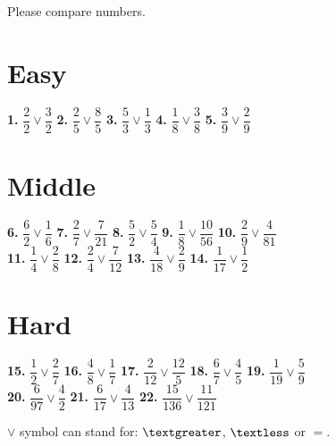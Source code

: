 \documentclass[a4paper, 12pt]{article}
\begin{document}
	{\large Please compare numbers.}	
	
	\section* {{\Large Easy}}
	
	{\Large \textbf{1.} $\dfrac{2}{2}\vee\dfrac{3}{2}$ \hspace{0.5cm}
		   \textbf{2.} $\dfrac{2}{5}\vee\dfrac{8}{5}$ \hspace{0.5cm}
		   \textbf{3.} $\dfrac{5}{3}\vee\dfrac{1}{3}$ \hspace{0.5cm}
		   \textbf{4.} $\dfrac{1}{8}\vee\dfrac{3}{8}$ \hspace{0.5cm}
           \textbf{5.} $\dfrac{3}{9}\vee\dfrac{2}{9}$
	
	\section* {{\Large Middle}}
	
	{\Large \textbf{6.} $\dfrac{6}{2}\vee\dfrac{1}{6}$ \hspace{0.5cm}
		   \textbf{7.} $\dfrac{2}{7}\vee\dfrac{7}{21}$ \hspace{0.5cm}
		   \textbf{8.} $\dfrac{5}{2}\vee\dfrac{5}{4}$ \hspace{0.5cm}
		   \textbf{9.} $\dfrac{1}{8}\vee\dfrac{10}{56}$ \hspace{0.5cm}
		   \textbf{10.} $\dfrac{2}{9}\vee\dfrac{4}{81}$ \\ [0.5cm]
		   \textbf{11.} $\dfrac{1}{4}\vee\dfrac{2}{8}$ \hspace{0.5cm}
		   \textbf{12.} $\dfrac{2}{4}\vee\dfrac{7}{12}$ \hspace{0.5cm}
		   \textbf{13.} $\dfrac{4}{18}\vee\dfrac{2}{9}$ \hspace{0.5cm}
		   \textbf{14.} $\dfrac{1}{17}\vee\dfrac{1}{2}$ \hspace{0.5cm}}
	
	\section* {{\Large Hard}}

		   \textbf{15.} $\dfrac{1}{2}\vee\dfrac{2}{7}$ \hspace{0.5cm}
		   \textbf{16.} $\dfrac{4}{8}\vee\dfrac{1}{7}$ \hspace{0.5cm}
		   \textbf{17.} $\dfrac{2}{12}\vee\dfrac{12}{5}$ \hspace{0.5cm}
		   \textbf{18.} $\dfrac{6}{7}\vee\dfrac{4}{5}$  \hspace{0.5cm}
		   \textbf{19.} $\dfrac{1}{19}\vee\dfrac{5}{9}$ \\ [0.5cm]
		   \textbf{20.} $\dfrac{6}{97}\vee\dfrac{4}{2}$  \hspace{0.5cm}
		   \textbf{21.} $\dfrac{6}{17}\vee\dfrac{4}{13}$  \hspace{0.5cm}
		   \textbf{22.} $\dfrac{15}{136}\vee\dfrac{11}{121}$  \\ [0.5cm]}
	   
	 {\large $\vee$ symbol can stand for: $\textgreater$, $\textless$ or $=$.}
		
\end{document}
